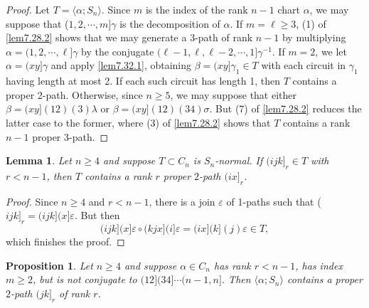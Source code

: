 \documentclass{surv-l}
\numberwithin{equation}{section}
\numberwithin{table}{section}
\numberwithin{figure}{section}
\theoremstyle{plain}
\newtheorem{lemma}[equation]{Lemma}
\newtheorem{proposition}[equation]{Proposition}
\theoremstyle{definition}
\begin{document}
\begin{proof} Let $T=\langle\alpha;S_{n}\rangle$. Since $m$ is the index
of the rank $n-1$ chart $\alpha$, we may suppose that ($1, 2,
\cdots, m]\gamma$ is the decomposition of $\alpha$. If $m=\ell\geq
3$, (1) of \ref{lem7.28.2} shows that we may generate a 3-path of
rank $n-1$ by multiplying $\alpha=(1,2, \cdots, \ell]\gamma$ by
the conjugate $(\ell-1, \ell, \ell-2, \cdots, 1]\gamma^{-1}$. If
$m=2$, we let $\alpha=(xy]\gamma$ and apply \ref{lem7.32.1},
obtaining $\beta=(xy]\gamma_{1}\in T$ with each circuit in
$\gamma_{1}$ having length at most 2. If each such circuit has
length 1, then $T$ contains a proper 2-path. Otherwise, since $n
\geq 5$, we may suppose that either $\beta=(xy](12)(3)\lambda$ or
$\beta=(xy](12)(34)\sigma$. But (7) of \ref{lem7.28.2} reduces the
latter case to the former, where (3) of \ref{lem7.28.2} shows that
$T$ contains a rank $n -1$ proper 3-path.
\end{proof}

\setcounter{equation}{3}
\begin{lemma}\label{lem7.32.4}
Let $n \geq 4$ and suppose $T\subset C_{n}$ is $S_{n}$-normal. If
$(ijk]_{r}\in T$ with $r<n-1$, then $T$ contains a rank $r$ proper
$2$-path $(ix]_{r}$.
\end{lemma}

\begin{proof} Since $n \geq 4$ and $r<n -1$, there is a join $\varepsilon$
of 1-paths such that ($ijk]_{r}=(ijk](x]\varepsilon$. But then
\[
(ijk](x]\varepsilon\circ (kjx](i]\varepsilon=(ix](k](j)\varepsilon\in T,
\]
which finishes the proof.
\end{proof}

\begin{proposition}\label{prop7.32.5}
Let $n \geq 4$ and suppose $\alpha\in C_{n}$ has rank $r<n -1$,
has index $m\geq 2$, but is not conjugate to $(12](34]\cdots(n-1,
n]$. Then $\langle\alpha;S_{n}\rangle$ contains a proper $2$-path
$(jk]_{r}$ of rank $r$.
\end{proposition}
\end{document}

